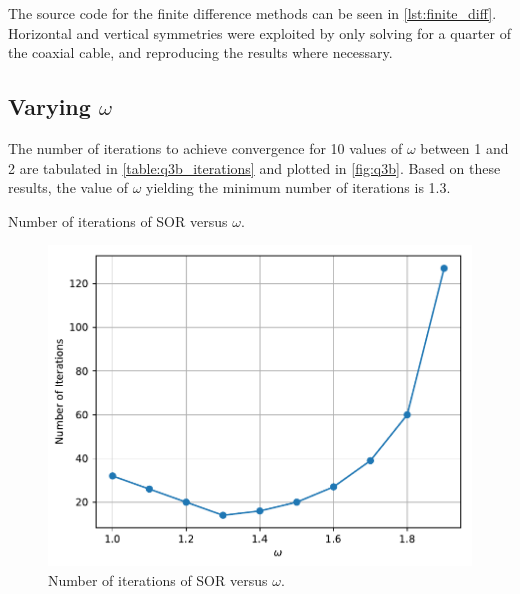 \documentclass[a4paper,titlepage]{article}
\begin{document}
	The source code for the finite difference methods can be seen in \autoref{lst:finite_diff}. Horizontal and vertical symmetries were exploited by only solving for a quarter of the coaxial cable, and reproducing the results where necessary.
	
	\subsection{Varying $\omega$}
	
	The number of iterations to achieve convergence for 10 values of $\omega$ between 1 and 2 are tabulated in \autoref{table:q3b_iterations} and plotted in \autoref{fig:q3b}. Based on these results, the value of $\omega$ yielding the minimum number of iterations is 1.3.
	
	\begin{table}[!htb]
		\centering
		\caption{Number of iterations of SOR versus $\omega$.}
		\label{table:q3b_iterations}
	\end{table}
	
	\begin{figure}[!htb]
		\centering
		\includegraphics[width=\columnwidth]{plots/q3b.pdf}
		\caption
		{Number of iterations of SOR versus $\omega$.}
		\label{fig:q3b}
	\end{figure}
\end{document}
